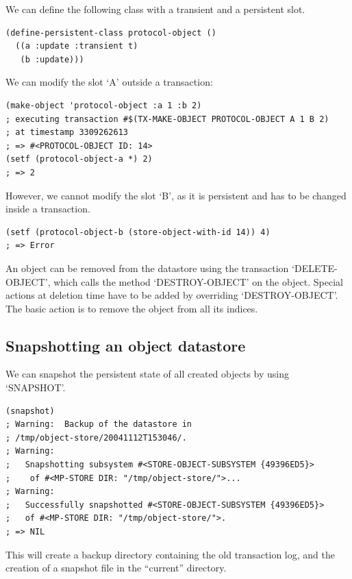 We can define the following class with a transient and a
persistent slot.

\begin{Verbatim}[fontsize=\small,frame=leftline,framerule=0.9mm,rulecolor=\color{gray},framesep=5.1mm,xleftmargin=5mm,fontfamily=cmtt]
(define-persistent-class protocol-object ()
  ((a :update :transient t)
   (b :update)))
\end{Verbatim}
We can modify the slot `A' outside a transaction:

\begin{Verbatim}[fontsize=\small,frame=leftline,framerule=0.9mm,rulecolor=\color{gray},framesep=5.1mm,xleftmargin=5mm,fontfamily=cmtt]
(make-object 'protocol-object :a 1 :b 2)
; executing transaction #$(TX-MAKE-OBJECT PROTOCOL-OBJECT A 1 B 2)
; at timestamp 3309262613
; => #<PROTOCOL-OBJECT ID: 14>
(setf (protocol-object-a *) 2)
; => 2
\end{Verbatim}
However, we cannot modify the slot `B', as it is persistent and
has to be changed inside a transaction.

\begin{Verbatim}[fontsize=\small,frame=leftline,framerule=0.9mm,rulecolor=\color{gray},framesep=5.1mm,xleftmargin=5mm,fontfamily=cmtt]
(setf (protocol-object-b (store-object-with-id 14)) 4)
; => Error
\end{Verbatim}
An object can be removed from the datastore using the transaction
`DELETE-OBJECT', which calls the method `DESTROY-OBJECT' on the
object. Special actions at deletion time have to be added by
overriding `DESTROY-OBJECT'. The basic action is to remove the
object from all its indices.


\subsection{ Snapshotting an object datastore}
We can snapshot the persistent state of all created objects by
using `SNAPSHOT'.

\begin{Verbatim}[fontsize=\small,frame=leftline,framerule=0.9mm,rulecolor=\color{gray},framesep=5.1mm,xleftmargin=5mm,fontfamily=cmtt]
(snapshot)
; Warning:  Backup of the datastore in
; /tmp/object-store/20041112T153046/.
; Warning:
;   Snapshotting subsystem #<STORE-OBJECT-SUBSYSTEM {49396ED5}>
;    of #<MP-STORE DIR: "/tmp/object-store/">...
; Warning:
;   Successfully snapshotted #<STORE-OBJECT-SUBSYSTEM {49396ED5}>
;   of #<MP-STORE DIR: "/tmp/object-store/">.
; => NIL
\end{Verbatim}
This will create a backup directory containing the old transaction
log, and the creation of a snapshot file in the ``current''
directory.

